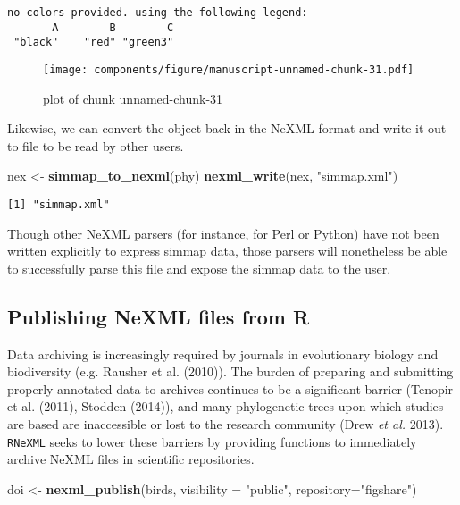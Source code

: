 \documentclass[author-year, review, 11pt]{components/elsarticle} %
\makeatletter
\newenvironment{Shaded}{\begin{snugshade}}{\end{snugshade}}
\newcommand{\KeywordTok}[1]{\textcolor[rgb]{0.13,0.29,0.53}{\textbf{{#1}}}}
\newcommand{\DataTypeTok}[1]{\textcolor[rgb]{0.13,0.29,0.53}{{#1}}}
\newcommand{\StringTok}[1]{\textcolor[rgb]{0.31,0.60,0.02}{{#1}}}
\newcommand{\NormalTok}[1]{{#1}}
\def\maxwidth{\ifdim\Gin@nat@width>\linewidth\linewidth
\else\Gin@nat@width\fi}
\let\Oldincludegraphics\includegraphics
\renewcommand{\includegraphics}[1]{\Oldincludegraphics[width=\maxwidth]{#1}}
\makeatother
\begin{document}
\begin{verbatim}
no colors provided. using the following legend:
       A        B        C 
 "black"    "red" "green3" 
\end{verbatim}

\begin{figure}[htbp]
\centering
\texttt{[image: components/figure/manuscript-unnamed-chunk-31.pdf]}
\caption{plot of chunk unnamed-chunk-31}
\end{figure}

Likewise, we can convert the object back in the NeXML format and write
it out to file to be read by other users.

\begin{Shaded}
\begin{Highlighting}[]
\NormalTok{nex <-}\StringTok{ }\KeywordTok{simmap_to_nexml}\NormalTok{(phy) }
\KeywordTok{nexml_write}\NormalTok{(nex, }\StringTok{"simmap.xml"}\NormalTok{)}
\end{Highlighting}
\end{Shaded}

\begin{verbatim}
[1] "simmap.xml"
\end{verbatim}

Though other NeXML parsers (for instance, for Perl or Python) have not
been written explicitly to express simmap data, those parsers will
nonetheless be able to successfully parse this file and expose the
simmap data to the user.

\subsection{Publishing NeXML files from
R}\label{publishing-nexml-files-from-r}

Data archiving is increasingly required by journals in evolutionary
biology and biodiversity (e.g. Rausher et al. (2010)). The burden of
preparing and submitting properly annotated data to archives continues
to be a significant barrier (Tenopir et al. (2011), Stodden (2014)), and
many phylogenetic trees upon which studies are based are inaccessible or
lost to the research community (Drew \emph{et al.} 2013).
\texttt{RNeXML} seeks to lower these barriers by providing functions to
immediately archive NeXML files in scientific repositories.

\begin{Shaded}
\begin{Highlighting}[]
\NormalTok{doi <-}\StringTok{ }\KeywordTok{nexml_publish}\NormalTok{(birds, }\DataTypeTok{visibility =} \StringTok{"public"}\NormalTok{, }\DataTypeTok{repository=}\StringTok{"figshare"}\NormalTok{)}
\end{Highlighting}
\end{Shaded}
\end{document}
